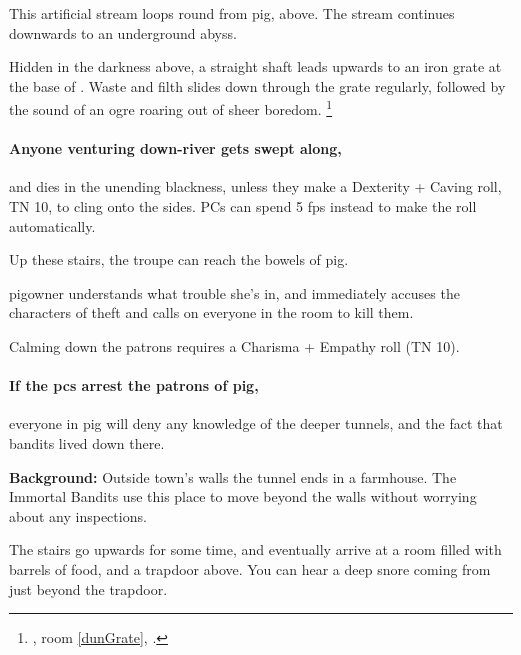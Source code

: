 
This artificial stream loops round from \gls{pig}, above.
The stream continues downwards to an underground abyss.

Hidden in the darkness above, a straight shaft leads upwards to an iron grate at the base of .
Waste and filth slides down through the grate regularly, followed by the sound of an ogre roaring out of sheer boredom.
\footnote{, room \ref{dunGrate}, .}

\paragraph{Anyone venturing down-river gets swept along,}
and dies in the unending blackness, unless they make a Dexterity + Caving roll, TN 10, to cling onto the sides.
PCs can spend 5 \glspl{fp} instead to make the roll automatically.


Up these stairs, the troupe can reach the bowels of \gls{pig}.

\Gls{pigowner} understands what trouble she's in, and immediately accuses the characters of theft and calls on everyone in the room to kill them.

Calming down the patrons requires a Charisma + Empathy roll (TN 10).

\paragraph{If the \glspl{pc} arrest the patrons of \gls{pig},}
everyone in \gls{pig} will deny any knowledge of the deeper tunnels, and the fact that bandits lived down there.


\textbf{Background:}
Outside \gls{town}'s walls the tunnel ends in a farmhouse.
The Immortal Bandits use this place to move beyond the walls without worrying about any inspections.

\begin{boxtext}

  The stairs go upwards for some time, and eventually arrive at a room filled with barrels of food, and a trapdoor above.
  You can hear a deep snore coming from just beyond the trapdoor.

\end{boxtext}


